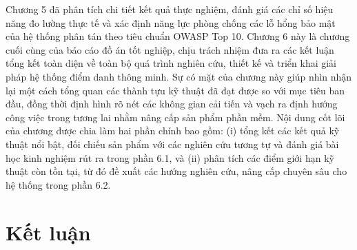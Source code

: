 ﻿\documentclass[../DoAn.tex]{subfiles}
\begin{document}
Chương 5 đã phân tích chi tiết kết quả thực nghiệm, đánh giá các chỉ số hiệu năng đo lường thực tế và xác định năng lực phòng chống các lỗ hổng bảo mật của hệ thống phân tán theo tiêu chuẩn OWASP Top 10. Chương 6 này là chương cuối cùng của báo cáo đồ án tốt nghiệp, chịu trách nhiệm đưa ra các kết luận tổng kết toàn diện về toàn bộ quá trình nghiên cứu, thiết kế và triển khai giải pháp hệ thống điểm danh thông minh. Sự có mặt của chương này giúp nhìn nhận lại một cách tổng quan các thành tựu kỹ thuật đã đạt được so với mục tiêu ban đầu, đồng thời định hình rõ nét các không gian cải tiến và vạch ra định hướng công việc trong tương lai nhằm nâng cấp sản phẩm phần mềm. Nội dung cốt lõi của chương được chia làm hai phần chính bao gồm: (i) tổng kết các kết quả kỹ thuật nổi bật, đối chiếu sản phẩm với các nghiên cứu tương tự và đánh giá bài học kinh nghiệm rút ra trong phần 6.1, và (ii) phân tích các điểm giới hạn kỹ thuật còn tồn tại, từ đó đề xuất các hướng nghiên cứu, nâng cấp chuyên sâu cho hệ thống trong phần 6.2.

\section{Kết luận}
\label{section:6.1}
\end{document}

